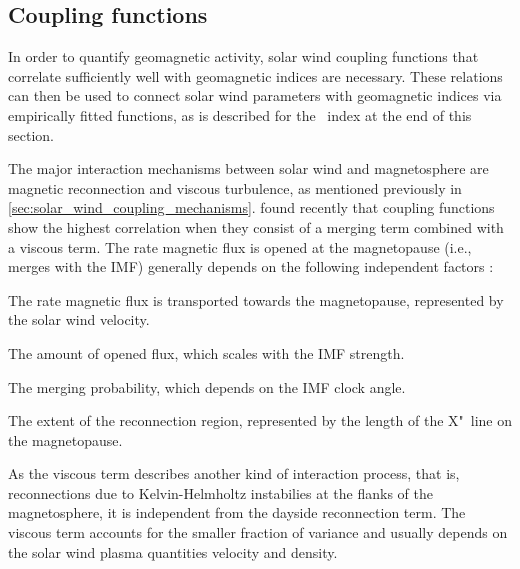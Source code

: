 \subsection{Coupling functions}
\label{sec:coupling_functions}
In order to quantify geomagnetic activity, solar wind coupling functions that correlate sufficiently well with geomagnetic indices are necessary. These relations can then be used to connect solar wind parameters with geomagnetic indices via empirically fitted functions, as is described for the \Kp~index at the end of this section.

The major interaction mechanisms between solar wind and magnetosphere are magnetic reconnection and viscous turbulence, as mentioned previously in \autoref{sec:solar_wind_coupling_mechanisms}. \citet{Newell2008} found recently that coupling functions show the highest correlation when they consist of a merging term combined with a viscous term.
The rate magnetic flux is opened at the magnetopause (i.e., merges with the IMF) generally depends on the following independent factors \citep{Newell2007}:
\begin{itemize*}
	\item The rate magnetic flux is transported towards the magnetopause, represented by the solar wind velocity.
	\item The amount of opened flux, which scales with the IMF strength.
	\item The merging probability, which depends on the IMF clock angle.
	\item The extent of the reconnection region, represented by the length of the X"~line on the magnetopause.
\end{itemize*}
As the viscous term describes another kind of interaction process, that is, reconnections due to Kelvin-Helm\-holtz instabilies at the flanks of the magnetosphere, it is independent from the dayside reconnection term. The viscous term accounts for the smaller fraction of variance and usually depends on the solar wind plasma quantities velocity and density.


